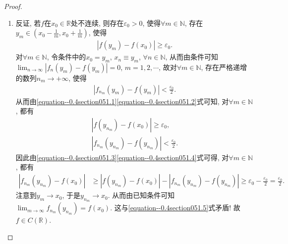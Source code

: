 \documentclass[../../main.tex]{subfiles}
\begin{document}
\begin{proof}
\begin{enumerate}
\item 反证, 若\(f\)在\(x_0\in \mathbb{R}\)处不连续, 则存在\(\varepsilon_0 > 0\), 使得\(\forall m\in \mathbb{N}\), 存在\(y_m\in (x_0 - \frac{1}{m}, x_0 + \frac{1}{m})\), 使得
\begin{align}
|f(y_m) - f(x_0)| \geqslant \varepsilon_0. \label{equation--0.4section051.1}
\end{align}
对\(\forall m\in \mathbb{N}\), 令条件中的\(x_0 = y_m\), \(x_n\equiv y_m\), \(\forall n\in \mathbb{N}\), 从而由条件可知\(\lim_{n\rightarrow \infty}|f_n(y_m) - f(y_m)| = 0\), \(m = 1,2,\cdots\),
故对\(\forall m\in \mathbb{N}\), 存在严格递增的数列\(n_m\rightarrow +\infty\), 使得
\begin{align}
|f_{n_m}(y_m) - f(y_m)| < \frac{\varepsilon_0}{2}. \label{equation--0.4section051.2}
\end{align}
从而由\eqref{equation--0.4section051.1}\eqref{equation--0.4section051.2}式可知, 对\(\forall m\in \mathbb{N}\), 都有
\begin{gather}
|f(y_{n_m}) - f(x_0)| \geqslant \varepsilon_0, \label{equation--0.4section051.3}\\
|f_{n_m}(y_{n_m}) - f(y_{n_m})| < \frac{\varepsilon_0}{2}. \label{equation--0.4section051.4}
\end{gather}
因此由\eqref{equation--0.4section051.3}\eqref{equation--0.4section051.4}式可得, 对\(\forall m\in \mathbb{N}\), 都有
\begin{align}
|f_{n_m}(y_{n_m}) - f(x_0)| &\geqslant |f(y_{n_m}) - f(x_0)| - |f_{n_m}(y_{n_m}) - f(y_{n_m})| \geqslant \varepsilon_0 - \frac{\varepsilon_0}{2} = \frac{\varepsilon_0}{2}. \label{equation--0.4section051.5}
\end{align}
注意到\(y_m\rightarrow x_0\), 于是\(y_{n_m}\rightarrow x_0\). 从而由已知条件可知\(\lim_{m\rightarrow \infty}f_{n_m}(y_{n_m}) = f(x_0)\). 这与\eqref{equation--0.4section051.5}式矛盾! 故\(f\in C(\mathbb{R})\). 
\end{enumerate}
\end{proof}
\end{document}
